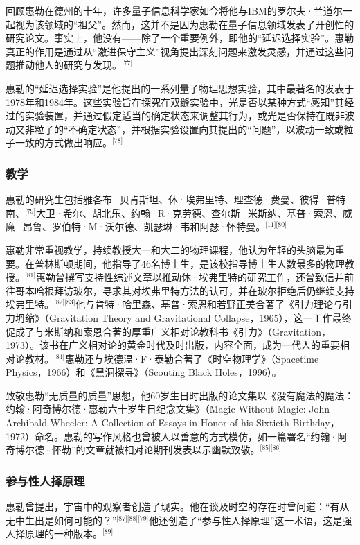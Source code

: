 回顾惠勒在德州的十年，许多量子信息科学家如今将他与IBM的罗尔夫·兰道尔一起视为该领域的“祖父”。然而，这并不是因为惠勒在量子信息领域发表了开创性的研究论文。事实上，他没有——除了一个重要例外，即他的“延迟选择实验”。惠勒真正的作用是通过从“激进保守主义”视角提出深刻问题来激发灵感，并通过这些问题推动他人的研究与发现。\(^\text{[77]}\)

惠勒的“延迟选择实验”是他提出的一系列量子物理思想实验，其中最著名的发表于1978年和1984年。这些实验旨在探究在双缝实验中，光是否以某种方式“感知”其经过的实验装置，并通过假定适当的确定状态来调整其行为，或光是否保持在既非波动又非粒子的“不确定状态”，并根据实验设置向其提出的“问题”，以波动一致或粒子一致的方式做出响应。\(^\text{[78]}\)
\subsubsection{教学}
惠勒的研究生包括雅各布·贝肯斯坦、休·埃弗里特、理查德·费曼、彼得·普特南、\(^\text{[79]}\)大卫·希尔、胡北乐、约翰·R·克劳德、查尔斯·米斯纳、基普·索恩、威廉·昂鲁、罗伯特·M·沃尔德、凯瑟琳·韦和阿瑟·怀特曼。\(^\text{[11][80]}\)

惠勒非常重视教学，持续教授大一和大二的物理课程，他认为年轻的头脑最为重要。在普林斯顿期间，他指导了46名博士生，是该校指导博士生人数最多的物理教授。\(^\text{[81]}\)惠勒曾撰写支持性综述文章以推动休·埃弗里特的研究工作，还曾致信并前往哥本哈根拜访玻尔，寻求其对埃弗里特方法的认可，并在玻尔拒绝后仍继续支持埃弗里特。\(^\text{[82][83]}\)他与肯特·哈里森、基普·索恩和若野正美合著了《引力理论与引力坍缩》（Gravitation Theory and Gravitational Collapse，1965），这一工作最终促成了与米斯纳和索恩合著的厚重广义相对论教科书《引力》（Gravitation，1973）。该书在广义相对论的黄金时代及时出版，内容全面，成为一代人的重要相对论教材。\(^\text{[84]}\)惠勒还与埃德温·F·泰勒合著了《时空物理学》（Spacetime Physics，1966）和《黑洞探寻》（Scouting Black Holes，1996）。

致敬惠勒“无质量的质量”思想，他60岁生日时出版的论文集以《没有魔法的魔法：约翰·阿奇博尔德·惠勒六十岁生日纪念文集》（Magic Without Magic: John Archibald Wheeler: A Collection of Essays in Honor of his Sixtieth Birthday，1972）命名。惠勒的写作风格也曾被人以善意的方式模仿，如一篇署名“约翰·阿奇博尔德·怀勒”的文章就被相对论期刊发表以示幽默致敬。\(^\text{[85][86]}\)
\subsubsection{参与性人择原理}
惠勒曾提出，宇宙中的观察者创造了现实。他在谈及时空的存在时曾问道：“有从无中生出是如何可能的？”\(^\text{[87][88][79]}\)他还创造了“参与性人择原理”这一术语，这是强人择原理的一种版本。\(^\text{[89]}\)

